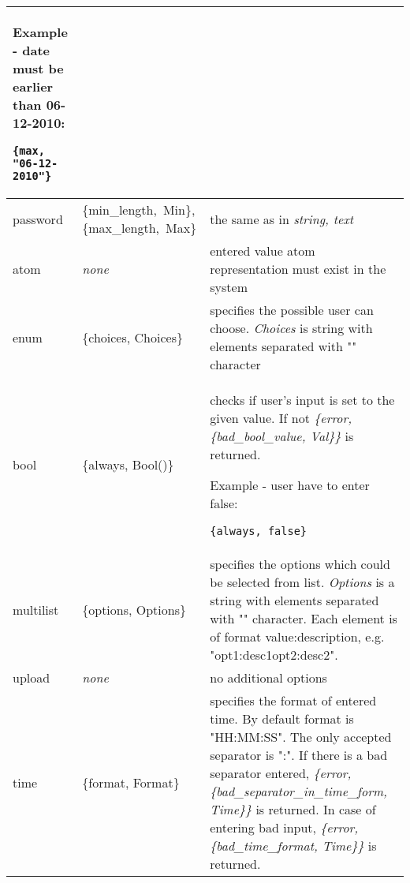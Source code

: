 \begin{longtable}{|p{}|p{}|p{}|}
Example - date must be earlier than 06-12-2010:
\begin{verbatim}
{max, "06-12-2010"}
\end{verbatim}\\
\hline
password & \{min\_length,~Min\}, \{max\_length,~Max\} & the same as in {\it string, text}\\
\hline
atom & {\it none} & entered value atom representation must exist in the system\\
\hline
enum & \{choices, Choices\} & specifies the possible user can choose. {\it Choices} is string with elements separated with "\vline" character\\
\hline
bool & \{always, Bool()\} & checks if user's input is set to the given value. If not {\it \{error, \{bad\_bool\_value, Val\}\}} is returned.

Example - user have to enter false:
\begin{verbatim}
{always, false}
\end{verbatim}\\
\hline
multilist & \{options, Options\} & specifies the options which could be selected from list. {\it Options} is a string with elements separated with "\vline" character. Each element is of format value:description, e.g. "opt1:desc1\vline opt2:desc2".\\
\hline
upload & {\it none} & no additional options\\
\hline
time & \{format, Format\} & specifies the format of entered time. By default format is "HH:MM:SS". The only accepted separator is ":". If there is a bad separator entered, {\it \{error, \{bad\_separator\_in\_time\_form, Time\}\}} is returned. In case of entering bad input, {\it \{error, \{bad\_time\_format, Time\}\}} is returned.


\end{longtable}

